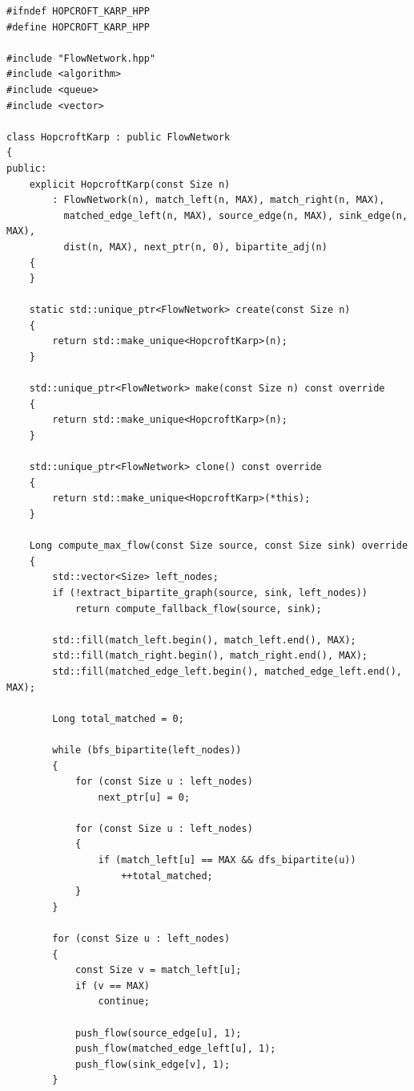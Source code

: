 \newpage

\label{ap:hopcroft_karp}

\begin{lstlisting}[caption={Implementação em C++ do algoritmo de Hopcroft-Karp para emparelhamento bipartido máximo.}, label={lst:hopcroft_karp}]
#ifndef HOPCROFT_KARP_HPP
#define HOPCROFT_KARP_HPP

#include "FlowNetwork.hpp"
#include <algorithm>
#include <queue>
#include <vector>

class HopcroftKarp : public FlowNetwork
{
public:
	explicit HopcroftKarp(const Size n)
	    : FlowNetwork(n), match_left(n, MAX), match_right(n, MAX),
	      matched_edge_left(n, MAX), source_edge(n, MAX), sink_edge(n, MAX),
	      dist(n, MAX), next_ptr(n, 0), bipartite_adj(n)
	{
	}

	static std::unique_ptr<FlowNetwork> create(const Size n)
	{
		return std::make_unique<HopcroftKarp>(n);
	}

	std::unique_ptr<FlowNetwork> make(const Size n) const override
	{
		return std::make_unique<HopcroftKarp>(n);
	}

	std::unique_ptr<FlowNetwork> clone() const override
	{
		return std::make_unique<HopcroftKarp>(*this);
	}

	Long compute_max_flow(const Size source, const Size sink) override
	{
		std::vector<Size> left_nodes;
		if (!extract_bipartite_graph(source, sink, left_nodes))
			return compute_fallback_flow(source, sink);

		std::fill(match_left.begin(), match_left.end(), MAX);
		std::fill(match_right.begin(), match_right.end(), MAX);
		std::fill(matched_edge_left.begin(), matched_edge_left.end(), MAX);

		Long total_matched = 0;

		while (bfs_bipartite(left_nodes))
		{
			for (const Size u : left_nodes)
				next_ptr[u] = 0;

			for (const Size u : left_nodes)
			{
				if (match_left[u] == MAX && dfs_bipartite(u))
					++total_matched;
			}
		}

		for (const Size u : left_nodes)
		{
			const Size v = match_left[u];
			if (v == MAX)
				continue;

			push_flow(source_edge[u], 1);
			push_flow(matched_edge_left[u], 1);
			push_flow(sink_edge[v], 1);
		}


\end{lstlisting}
